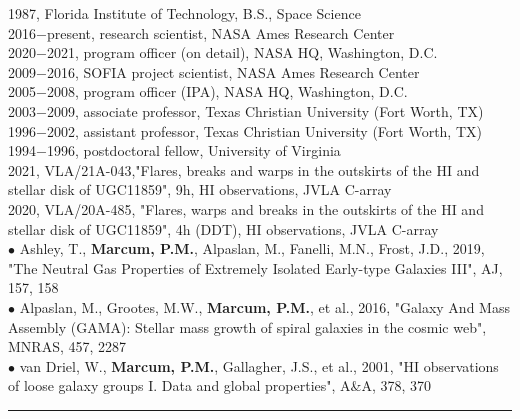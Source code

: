 1987, Florida Institute of Technology, B.S., Space Science
\mySectionSpacing
{}\\
2016$-$present, research scientist, NASA Ames Research Center\\
2020$-$2021, program officer (on detail), NASA HQ, Washington, D.C.\\
2009$-$2016, SOFIA project scientist, NASA Ames Research Center\\
2005$-$2008, program officer (IPA), NASA HQ, Washington, D.C.\\
2003$-$2009, associate professor, Texas Christian University (Fort Worth, TX)\\
1996$-$2002, assistant professor, Texas Christian University (Fort Worth, TX)\\
1994$-$1996, postdoctoral fellow, University of Virginia
\mySectionSpacing
{}\\
2021, VLA/21A-043,"Flares, breaks and warps in the outskirts of the HI and stellar disk of UGC11859", 9h, HI observations, JVLA C-array\\
2020, VLA/20A-485, "Flares, warps and breaks in the outskirts of the HI and stellar disk of UGC11859", 4h (DDT), HI observations, JVLA C-array
\mySectionSpacing
{}\\
{\scriptsize{$\bullet$}} Ashley, T., \textbf{Marcum, P.M.}, Alpaslan, M., Fanelli, M.N., Frost, J.D., 2019, "The Neutral Gas Properties of Extremely Isolated Early-type Galaxies III", AJ, 157, 158\\
{\scriptsize{$\bullet$}} Alpaslan, M., Grootes, M.W., \textbf{Marcum, P.M.}, et al., 2016, "Galaxy And Mass Assembly (GAMA): Stellar mass growth of spiral galaxies in the cosmic web", MNRAS, 457, 2287\\
{\scriptsize{$\bullet$}} van Driel, W., \textbf{Marcum, P.M.}, Gallagher, J.S., et al., 2001, "HI observations of loose galaxy groups I. Data and global properties", A\&A, 378, 370
\medskip \hrule \vspace{5pt} \medskip